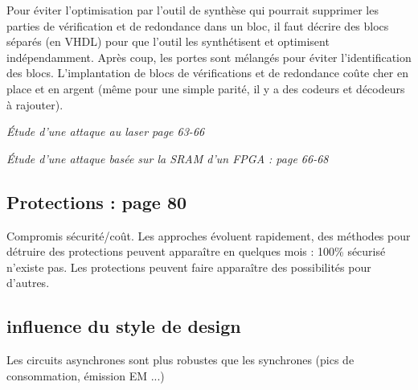 \documentclass[a4paper,12pt]{article}
\begin{document}
Pour éviter l'optimisation par l'outil de synthèse qui pourrait supprimer les parties de vérification et de redondance dans un bloc, il faut décrire des blocs séparés (en VHDL) pour que l'outil les synthétisent et optimisent indépendamment. Après coup, les portes sont mélangés pour éviter l'identification des blocs.
L'implantation de blocs de vérifications et de redondance coûte cher en place et en argent (même pour une simple parité, il y a des codeurs et décodeurs à rajouter).

{\it Étude d'une attaque au laser page 63-66}

{\it Étude d'une attaque basée sur la SRAM d'un FPGA : page 66-68}

\subsection{Protections : page 80}
Compromis sécurité/coût. Les approches évoluent rapidement, des méthodes pour détruire des protections peuvent apparaître en quelques mois : 100\% sécurisé n'existe pas. Les protections peuvent faire apparaître des possibilités pour d'autres.

\subsection{influence du style de design}
Les circuits asynchrones sont plus robustes que les synchrones (pics de consommation, émission EM ...)
\end{document}
